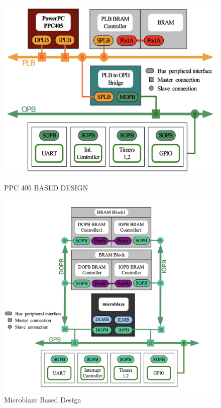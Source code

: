 \documentclass[conference]{IEEEtran}
\begin{document}
\begin{figure}[ht]
  \centering
  \begin{minipage}[b]{0.45\linewidth}
    \includegraphics[width=\linewidth]{Screenshot 2023-11-08 at 19.59.01.png}
    \caption{PPC 405 BASED DESIGN}
    \label{fig:image1}
  \end{minipage}
  \hfill %
  \begin{minipage}[b]{0.45\linewidth}
    \includegraphics[width=\linewidth]{Screenshot 2023-11-08 at 19.59.27.png}
    \caption{Microblaze Based Design}
    \label{fig:image2}
  \end{minipage}
\end{figure}
\end{document}
